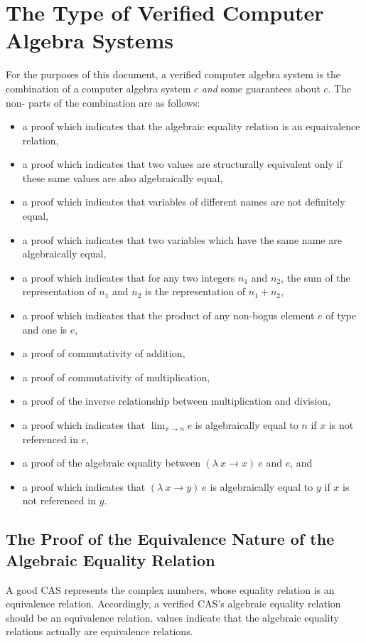 \documentclass{report}
\begin{document}
\section{The Type of Verified Computer Algebra Systems}
For the purposes of this document, a verified computer algebra system is the combination of a  computer algebra system \(c\) \emph{and} some guarantees about \(c\).  The non- parts of the combination are as follows:

\begin{itemize}
 \item a proof which indicates that the algebraic equality relation is an equaivalence relation,
 \item a proof which indicates that two values are structurally equivalent only if these same values are also algebraically equal,
 \item a proof which indicates that variables of different names are not definitely equal,
 \item a proof which indicates that two variables which have the same name are algebraically equal,
 \item a proof which indicates that for any two integers \(n_1\) and \(n_2\), the sum of the representation of \(n_1\) and \(n_2\) is the representation of \(n_1 + n_2\),
 \item a proof which indicates that the product of any non-bogus element \(e\) of type  and one is \(e\),
 \item a proof of commutativity of addition,
 \item a proof of commutativity of multiplication,
 \item a proof of the inverse relationship between multiplication and division,
 \item a proof which indicates that \(\lim_{x \rightarrow n} e\) is algebraically equal to \(n\) if \(x\) is not referenced in \(e\),
 \item a proof of the algebraic equality between \(\left(\lambda\ x \rightarrow x\right)\ e\) and \(e\), and
 \item a proof which indicates that \(\left(\lambda\ x \rightarrow y\right)\ e\) is algebraically equal to \(y\) if \(x\) is not referenced in \(y\).
\end{itemize}

\subsection{The Proof of the Equivalence Nature of the Algebraic Equality Relation}
A good CAS represents the complex numbers, whose equality relation is an equivalence relation.  Accordingly, a verified CAS's algebraic equality relation should be an equivalence relation.   values indicate that the algebraic equality relations actually are equivalence relations.
\end{document}
